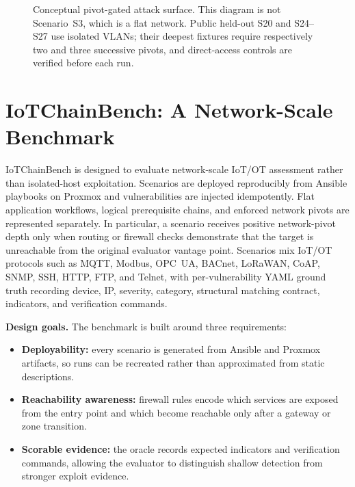 \documentclass[conference,compsoc]{IEEEtran}
\newcommand{\systemname}{IoTChainBench\xspace}
\begin{document}
\begin{figure}[t]
{%
}
\caption{Conceptual pivot-gated attack surface. This diagram is not Scenario~S3,
which is a flat network. Public held-out S20 and S24--S27 use isolated VLANs;
their deepest fixtures require respectively two and three successive pivots,
and direct-access controls are verified before each run.}
\label{fig:attack-chain}
\end{figure}

\section{\systemname: A Network-Scale Benchmark}
\label{sec:iotbench}

\systemname{} is designed to evaluate network-scale IoT/OT assessment rather than isolated-host exploitation. Scenarios are deployed reproducibly from Ansible playbooks on Proxmox and vulnerabilities are injected idempotently. Flat application workflows, logical prerequisite chains, and enforced network pivots are represented separately. In particular, a scenario receives positive network-pivot depth only when routing or firewall checks demonstrate that the target is unreachable from the original evaluator vantage point. Scenarios mix IoT/OT protocols such as MQTT, Modbus, OPC~UA, BACnet, LoRaWAN, CoAP, SNMP, SSH, HTTP, FTP, and Telnet, with per-vulnerability YAML ground truth recording device, IP, severity, category, structural matching contract, indicators, and verification commands.

\medskip\noindent\textbf{Design goals.}
The benchmark is built around three requirements:
\begin{itemize}[leftmargin=*,nosep]
  \item \textbf{Deployability:} every scenario is generated from Ansible and Proxmox artifacts, so runs can be recreated rather than approximated from static descriptions.
  \item \textbf{Reachability awareness:} firewall rules encode which services are exposed from the entry point and which become reachable only after a gateway or zone transition.
  \item \textbf{Scorable evidence:} the oracle records expected indicators and verification commands, allowing the evaluator to distinguish shallow detection from stronger exploit evidence.
\end{itemize}
\end{document}
